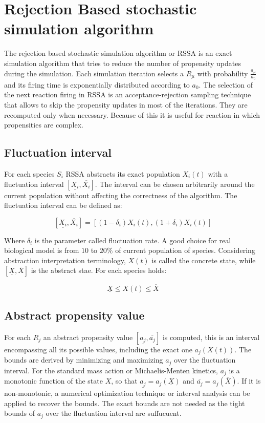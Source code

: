 \section{Rejection Based stochastic simulation algorithm}
The rejection based stochastic simulation algorithm or RSSA is an exact simulation algorithm that tries to reduce the number of propensity updates during the simulation.
Each simulation iteration selects a $R_\mu$ with probability $\frac{a_\mu}{a_0}$ and its firing time is exponentially distributed according to $a_0$.
The selection of the next reaction firing in RSSA is an acceptance-rejection sampling technique that allows to skip the propensity updates in most of the iterations.
They are recomputed only when necessary.
Because of this it is useful for reaction in which propensities are complex.

  \subsection{Fluctuation interval}
  For each species $S_i$ RSSA abstracts its exact population $X_i(t)$ with a fluctuation interval $[\underline{X_i}, \overline{X_i}]$.
  The interval can be chosen arbitrarily around the current population without affecting the correctness of the algorithm.
  The fluctuation interval can be defined as:

  $$[\underline{X_i}, \overline{X_i}] = [(1-\delta_i)X_i(t), (1+\delta_i)X_i(t)]$$

  Where $\delta_i$ is the parameter called fluctuation rate.
  A good choice for real biological model is from $10$ to $20\%$ of current population of species.
  Considering abstraction interpretation terminology, $X(t)$ is called the concrete state, while $[\underline{X},\overline{X}]$ is the abstract stae.
  For each species holds:

  $$\underline{X}\le X(t)\le \overline{X}$$

  \subsection{Abstract propensity value}
  For each $R_j$ an abstract propensity value $[\underline{a_j},\overline{a_j}]$ is computed, this is an interval encompassing all its possible values, including the exact one $a_j(X(t))$.
  The bounds are derived by minimizing and maximizing $a_j$ over the fluctuation interval.
  For the standard mass action or Michaelis-Menten kinetics, $a_j$ is a monotonic function of the state $X$, so that $\underline{a_j} = a_j(\underline{X})$ and $\overline{a_j} = a_j(\overline{X})$.
  If it is non-monotonic, a numerical optimization technique or interval analysis can be applied to recover the bounds.
  The exact bounds are not needed as the tight bounds of $a_j$ over the fluctuation interval are suffucuent.

